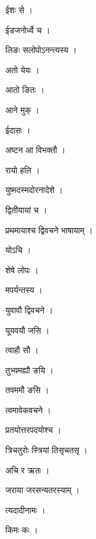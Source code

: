 \documentclass[10pt, openany]{book}
\begin{document}
\noindent ईशः से ।

\noindent ईडजनोर्ध्वे च ।

\noindent लिङः सलोपोऽनन्त्यस्य ।

\noindent अतो येयः ।

\noindent आतो ङितः ।

\noindent आने मुक् ।

\noindent ईदासः ।

\noindent अष्टन आ विभक्तौ ।

\noindent रायो हलि ।

\noindent युष्मदस्मदोरनादेशे ।

\noindent द्वितीयायां च ।

\noindent प्रथमायाश्च द्विवचने भाषायाम् ।

\noindent योऽचि ।

\noindent शेषे लोपः ।

\noindent मपर्यन्तस्य ।

\noindent युवावौ द्विवचने ।

\noindent यूयवयौ जसि ।

\noindent त्वाहौ सौ ।

\noindent तुभ्यमह्यौ ङयि ।

\noindent तवममौ ङसि ।

\noindent त्वमावेकवचने ।

\noindent प्रतयोत्तरपदयोश्च ।

\noindent त्रिचतुरोः स्त्रियां तिसृचतसृ ।

\noindent अचि र ऋतः ।

\noindent जराया जरसन्यतरस्याम् ।

\noindent त्यदादीनामः ।

\noindent किमः कः ।
\end{document}
